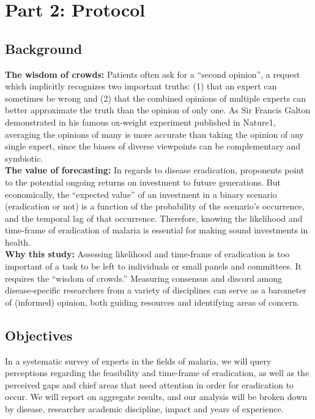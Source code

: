 \documentclass{article}
\begin{document}
\newpage
\section*{Part 2: Protocol}


\subsection*{Background}

\noindent \textbf{The wisdom of crowds:} Patients often ask for a “second opinion”, a request which implicitly recognizes two important truths: (1) that an expert can sometimes be wrong and (2) that the combined opinions of multiple experts can better approximate the truth than the opinion of only one. As Sir Francis Galton demonstrated in his famous ox-weight experiment published in Nature1, averaging the opinions of many is more accurate than taking the opinion of any single expert, since the biases of diverse viewpoints can be complementary and symbiotic. \\

\noindent \textbf{The value of forecasting:} In regards to disease eradication, proponents point to the potential ongoing returns on investment to future generations. But economically, the “expected value” of an investment in a binary scenario (eradication or not) is a function of the probability of the scenario’s occurrence, and the temporal lag of that occurrence. Therefore, knowing the likelihood and time-frame of eradication of malaria is essential for making sound investments in health. \\

\noindent \textbf{Why this study:} Assessing likelihood and time-frame of eradication is too important of a task to be left to individuals or small panels and committees. It requires the “wisdom of crowds.” Measuring consensus and discord among disease-specific researchers from a variety of disciplines can serve as a barometer of (informed) opinion, both guiding resources and identifying areas of concern.

\subsection*{Objectives}


In a systematic survey of experts in the fields of malaria, we will query perceptions regarding the feasibility and time-frame of eradication, as well as the perceived gaps and chief areas that need attention in order for eradication to occur. We will report on aggregate results, and our analysis will be broken down by disease, researcher academic discipline, impact and years of experience. \\
\end{document}
